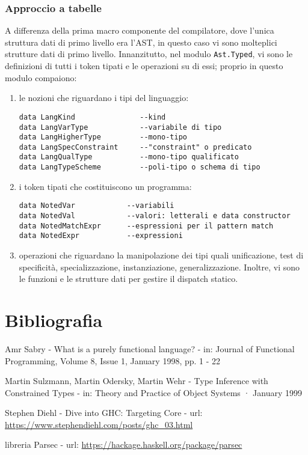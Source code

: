 \documentclass[10pt,a4paper]{article}
\begin{document}
\subsubsection{Approccio a tabelle}
A differenza della prima macro componente del compilatore, dove l'unica struttura dati di primo livello era l'AST, in
questo caso vi sono molteplici strutture dati di primo livello. Innanzitutto, nel modulo \texttt{Ast.Typed}, vi sono
le definizioni di tutti i token tipati e le operazioni su di essi; proprio in questo modulo compaiono:
\begin{enumerate}
    \item le nozioni che riguardano i tipi del linguaggio:
    \begin{lstlisting}
data LangKind               --kind
data LangVarType            --variabile di tipo
data LangHigherType         --mono-tipo
data LangSpecConstraint     --"constraint" o predicato
data LangQualType           --mono-tipo qualificato
data LangTypeScheme         --poli-tipo o schema di tipo
    \end{lstlisting}
    \item i token tipati che costituiscono un programma:
    \begin{lstlisting}
data NotedVar            --variabili
data NotedVal            --valori: letterali e data constructor
data NotedMatchExpr      --espressioni per il pattern match
data NotedExpr           --expressioni
    \end{lstlisting}
    \item operazioni che riguardano la manipolazione dei tipi quali unificazione, test di specificità, specializzazione,
    instanziazione, generalizzazione. Inoltre, vi sono le funzioni e le strutture dati per gestire il dispatch statico.
\end{enumerate}

\section*{Bibliografia}
\begin{enumerate}[label={[\arabic*]}]
    \item Amr Sabry - What is a purely functional language? - in: Journal of Functional Programming, Volume 8, Issue 1,
    January 1998, pp. 1 - 22
    \item Martin Sulzmann, Martin Odersky, Martin Wehr - Type Inference with Constrained Types - in: Theory and Practice
    of Object Systems · January 1999
    \item Stephen Diehl - Dive into GHC: Targeting Core - url: \url{https://www.stephendiehl.com/posts/ghc_03.html}
    \item libreria Parsec - url: \url{https://hackage.haskell.org/package/parsec}
\end{enumerate}
\end{document}
